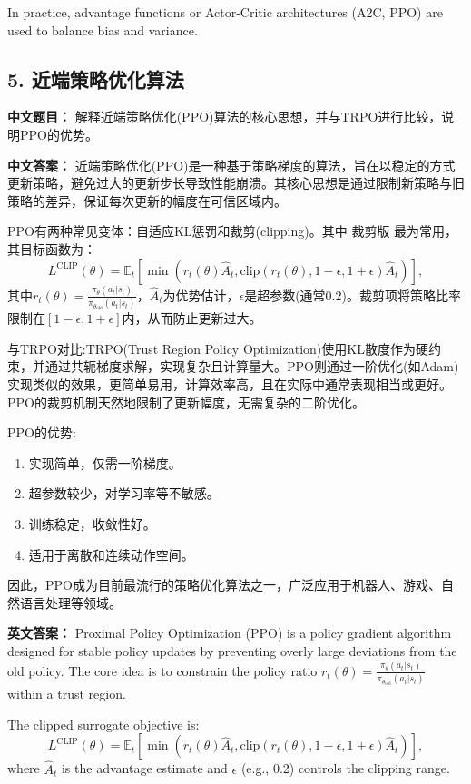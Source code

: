 \documentclass[10pt,a4paper]{ctexart}
\begin{document}
In practice, advantage functions or Actor-Critic architectures (A2C, PPO) are used to balance bias and variance.

\subsection*{5. 近端策略优化算法}
\textbf{中文题目：} 解释近端策略优化(PPO)算法的核心思想，并与TRPO进行比较，说明PPO的优势。

\textbf{中文答案：}  
近端策略优化(PPO)是一种基于策略梯度的算法，旨在以稳定的方式更新策略，避免过大的更新步长导致性能崩溃。其核心思想是通过限制新策略与旧策略的差异，保证每次更新的幅度在可信区域内。

PPO有两种常见变体：自适应KL惩罚和裁剪(clipping)。其中 裁剪版 最为常用，其目标函数为：
\[
L^{\text{CLIP}}(\theta) = \mathbb{E}_t \left[ \min\left( r_t(\theta) \hat{A}_t, \text{clip}(r_t(\theta), 1-\epsilon, 1+\epsilon) \hat{A}_t \right) \right],
\]  
其中\(r_t(\theta)=\frac{\pi_\theta(a_t|s_t)}{\pi_{\theta_{\text{old}}}(a_t|s_t)}\)，\(\hat{A}_t\)为优势估计，\(\epsilon\)是超参数(通常0.2)。裁剪项将策略比率限制在\([1-\epsilon, 1+\epsilon]\)内，从而防止更新过大。

 与TRPO对比:TRPO(Trust Region Policy Optimization)使用KL散度作为硬约束，并通过共轭梯度求解，实现复杂且计算量大。PPO则通过一阶优化(如Adam)实现类似的效果，更简单易用，计算效率高，且在实际中通常表现相当或更好。PPO的裁剪机制天然地限制了更新幅度，无需复杂的二阶优化。

 PPO的优势:
\begin{enumerate}
    \item 实现简单，仅需一阶梯度。
    \item 超参数较少，对学习率等不敏感。
    \item 训练稳定，收敛性好。
    \item 适用于离散和连续动作空间。
\end{enumerate}

因此，PPO成为目前最流行的策略优化算法之一，广泛应用于机器人、游戏、自然语言处理等领域。

\textbf{英文答案：}  
Proximal Policy Optimization (PPO) is a policy gradient algorithm designed for stable policy updates by preventing overly large deviations from the old policy. The core idea is to constrain the policy ratio \(r_t(\theta)=\frac{\pi_\theta(a_t|s_t)}{\pi_{\theta_{\text{old}}}(a_t|s_t)}\) within a trust region.

The clipped surrogate objective is:
\[
L^{\text{CLIP}}(\theta) = \mathbb{E}_t \left[ \min\left( r_t(\theta) \hat{A}_t, \text{clip}(r_t(\theta), 1-\epsilon, 1+\epsilon) \hat{A}_t \right) \right],
\]  
where \(\hat{A}_t\) is the advantage estimate and \(\epsilon\) (e.g., 0.2) controls the clipping range.
\end{document}
